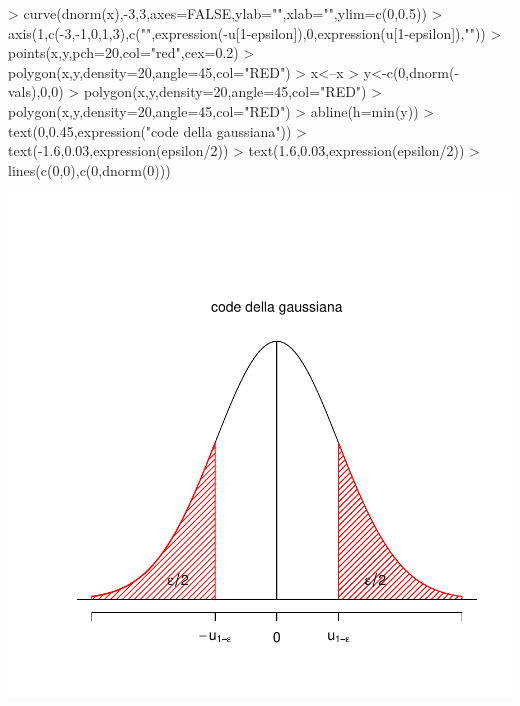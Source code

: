 \documentclass[onecolumn,11pt]{book}
\begin{document}
\begin{Schunk}
\begin{Sinput}
> curve(dnorm(x),-3,3,axes=FALSE,ylab="",xlab="",ylim=c(0,0.5))
> axis(1,c(-3,-1,0,1,3),c("",expression(-u[1-epsilon]),0,expression(u[1-epsilon]),""))
> points(x,y,pch=20,col="red",cex=0.2)
> polygon(x,y,density=20,angle=45,col="RED")
> x<--x
> y<-c(0,dnorm(-vals),0,0)
> polygon(x,y,density=20,angle=45,col="RED")
> polygon(x,y,density=20,angle=45,col="RED")
> abline(h=min(y))
> text(0,0.45,expression("code della gaussiana"))
> text(-1.6,0.03,expression(epsilon/2))
> text(1.6,0.03,expression(epsilon/2))
> lines(c(0,0),c(0,dnorm(0))) 
\end{Sinput}
\end{Schunk}
\includegraphics{statisticaconR-363}
\end{document}
